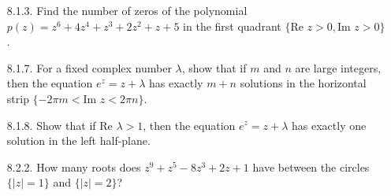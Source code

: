 \documentclass[9pt]{article}
\begin{document}
\begin{enumerate}
   \item[8.1.3.]  Find the number of zeros of the polynomial
                  $p(z) = z^6 + 4z^4 + z^3 + 2z^2 + z + 5$ in the first quadrant
                  $\{\text{Re }z > 0, \text{Im }z > 0\}$.
   \item[8.1.7.]  For a fixed complex number $\lambda$, show that if $m$ and $n$
                  are large integers, then the equation $e^z = z + \lambda$ has
                  exactly $m + n$ solutions in the horizontal strip
                  $\{-2\pi m < \text{Im }z < 2\pi n\}$.
   \item[8.1.8.]  Show that if $\text{Re }\lambda > 1$, then the equation
                  $e^z = z + \lambda$ has exactly one solution in the left
                  half-plane.
   \item[8.2.2.]  How many roots does $z^9 + z^5 - 8z^3 + 2z + 1$ have between
                  the circles $\{|z| = 1\}$ and $\{|z| = 2\}$?


\end{enumerate}
\end{document}
